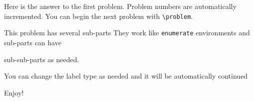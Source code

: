 \documentclass[letterpaper]{homework}
\author{Your Name}          %
\begin{document}
\problem
Here is the answer to the first problem.
Problem numbers are automatically incremented.
You can begin the next problem with \texttt{\textbackslash problem}.

\problem
\begin{subparts}
    \subpart This problem has several sub-parts
    \subpart They work like \texttt{enumerate} environments
    \subpart and sub-parts can have
    \begin{subparts}
        \subpart sub-sub-parts
        \subpart as needed.
    \end{subparts}
\end{subparts}

\problem
\begin{subparts}[\bf (A.)]
    \subpart You can change the label type as needed
    \subpart and it will be automatically continued
\end{subparts}

\problem
Enjoy!
\end{document}
